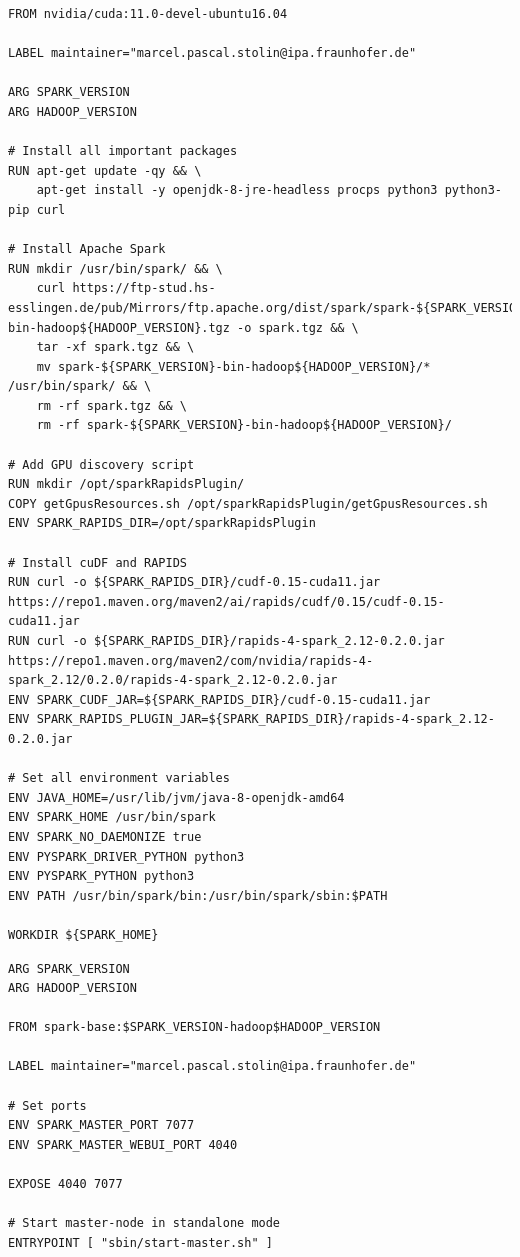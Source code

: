 \begin{lstlisting}[label=lst:appendix_spark_base_dockerfile, caption=Apache Spark base image Dockerfile]
FROM nvidia/cuda:11.0-devel-ubuntu16.04
 
LABEL maintainer="marcel.pascal.stolin@ipa.fraunhofer.de"
 
ARG SPARK_VERSION
ARG HADOOP_VERSION
 
# Install all important packages
RUN apt-get update -qy && \
    apt-get install -y openjdk-8-jre-headless procps python3 python3-pip curl
 
# Install Apache Spark
RUN mkdir /usr/bin/spark/ && \
    curl https://ftp-stud.hs-esslingen.de/pub/Mirrors/ftp.apache.org/dist/spark/spark-${SPARK_VERSION}/spark-${SPARK_VERSION}-bin-hadoop${HADOOP_VERSION}.tgz -o spark.tgz && \
    tar -xf spark.tgz && \
    mv spark-${SPARK_VERSION}-bin-hadoop${HADOOP_VERSION}/* /usr/bin/spark/ && \
    rm -rf spark.tgz && \
    rm -rf spark-${SPARK_VERSION}-bin-hadoop${HADOOP_VERSION}/
 
# Add GPU discovery script
RUN mkdir /opt/sparkRapidsPlugin/
COPY getGpusResources.sh /opt/sparkRapidsPlugin/getGpusResources.sh
ENV SPARK_RAPIDS_DIR=/opt/sparkRapidsPlugin
 
# Install cuDF and RAPIDS
RUN curl -o ${SPARK_RAPIDS_DIR}/cudf-0.15-cuda11.jar https://repo1.maven.org/maven2/ai/rapids/cudf/0.15/cudf-0.15-cuda11.jar
RUN curl -o ${SPARK_RAPIDS_DIR}/rapids-4-spark_2.12-0.2.0.jar https://repo1.maven.org/maven2/com/nvidia/rapids-4-spark_2.12/0.2.0/rapids-4-spark_2.12-0.2.0.jar
ENV SPARK_CUDF_JAR=${SPARK_RAPIDS_DIR}/cudf-0.15-cuda11.jar
ENV SPARK_RAPIDS_PLUGIN_JAR=${SPARK_RAPIDS_DIR}/rapids-4-spark_2.12-0.2.0.jar
 
# Set all environment variables
ENV JAVA_HOME=/usr/lib/jvm/java-8-openjdk-amd64
ENV SPARK_HOME /usr/bin/spark
ENV SPARK_NO_DAEMONIZE true
ENV PYSPARK_DRIVER_PYTHON python3
ENV PYSPARK_PYTHON python3
ENV PATH /usr/bin/spark/bin:/usr/bin/spark/sbin:$PATH
 
WORKDIR ${SPARK_HOME}
\end{lstlisting}


\begin{lstlisting}[label=lst:appendix_spark_master_dockerfile, caption=Apache Spark master image Dockerfile]
ARG SPARK_VERSION
ARG HADOOP_VERSION
 
FROM spark-base:$SPARK_VERSION-hadoop$HADOOP_VERSION
 
LABEL maintainer="marcel.pascal.stolin@ipa.fraunhofer.de"
 
# Set ports
ENV SPARK_MASTER_PORT 7077
ENV SPARK_MASTER_WEBUI_PORT 4040
 
EXPOSE 4040 7077
 
# Start master-node in standalone mode
ENTRYPOINT [ "sbin/start-master.sh" ]
\end{lstlisting}


